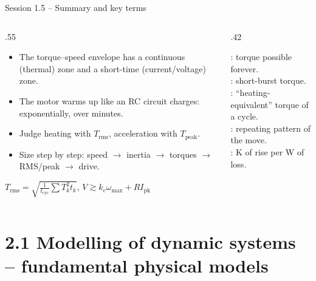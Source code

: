\documentclass[aspectratio=169,10pt]{beamer}
\begin{document}
\begin{frame}{Session 1.5 -- Summary and key terms}
\begin{columns}[T]
\begin{column}{.55\textwidth}
\small
\begin{itemize}
\item The torque--speed envelope has a continuous (thermal) zone and a short-time (current/voltage) zone.
\item The motor warms up like an RC circuit charges: exponentially, over minutes.
\item Judge heating with $T_\text{rms}$, acceleration with $T_\text{peak}$.
\item Size step by step: speed $\to$ inertia $\to$ torques $\to$ RMS/peak $\to$ drive.
\end{itemize}
\begin{keybox}[Remember]
$T_\text{rms}=\sqrt{\tfrac{1}{t_\text{cyc}}\sum T_k^2t_k}$, \quad $V\gtrsim k_e\omega_\text{max}+RI_\text{pk}$
\end{keybox}
\end{column}
\begin{column}{.42\textwidth}
\begin{defbox}
\small
{}: torque possible forever.\\
: short-burst torque.\\
: ``heating-equivalent'' torque of a cycle.\\
: repeating pattern of the move.\\
: K of rise per W of loss.
\end{defbox}
\end{column}
\end{columns}
\end{frame}

\section{2.1 Modelling of dynamic systems -- fundamental physical models}
\end{document}

